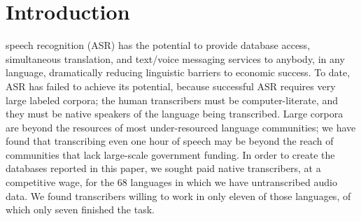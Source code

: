 \section{Introduction}

 speech recognition (ASR) has the potential to provide
database access, simultaneous translation, and text/voice messaging
services to anybody, in any language, dramatically reducing linguistic
barriers to economic success.  To date, ASR has failed to achieve its
potential, because successful ASR requires very large labeled
corpora;
the human transcribers must be computer-literate, and
they must be native speakers of the language being transcribed.
{\color{blue} Large corpora are beyond the resources of most
  under-resourced language communities; we have found that
  transcribing even one hour of speech may be beyond the reach of
  communities that lack large-scale government funding.  In order to
  create the databases reported in this paper, we sought paid native
  transcribers, at a competitive wage, for the 68 languages in which
  we have untranscribed audio data.  We found transcribers willing to
  work in only eleven of those languages, of which only seven finished
  the task.}


